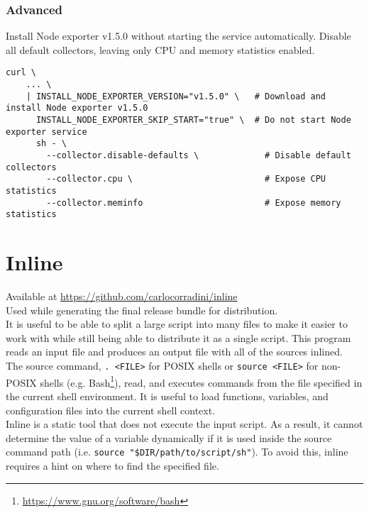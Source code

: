 \subsubsection{Advanced}
\label{subsubsec:corollary_projects_node_exporter_installer_example_advanced}

Install Node exporter v1.5.0 without starting the service automatically. Disable
all default collectors, leaving only CPU and memory statistics enabled.

\begin{lstlisting}[language=shell, alsoletter={-, .}, morekeywords={[3]{..., --collector.disable-defaults, --collector.cpu, --collector.meminfo, -}}, morekeywords={[4]{INSTALL_NODE_EXPORTER_VERSION, INSTALL_NODE_EXPORTER_SKIP_START}}, xleftmargin=\parindent, caption=Advanced installation with custom configuration parameters]
  curl \
    ... \
    | INSTALL_NODE_EXPORTER_VERSION="v1.5.0" \   # Download and install Node exporter v1.5.0
      INSTALL_NODE_EXPORTER_SKIP_START="true" \  # Do not start Node exporter service
      sh - \
        --collector.disable-defaults \             # Disable default collectors
        --collector.cpu \                          # Expose CPU statistics
        --collector.meminfo                        # Expose memory statistics
\end{lstlisting}

\section{Inline}
\label{sec:corollary_projects_inline}

Available at \url{https://github.com/carlocorradini/inline} \\ %
Used while generating the final release bundle for distribution. \\ %
It is useful to be able to split a large script into many files to make it easier
to work with while still being able to distribute it as a single script. This
program reads an input file and produces an output file with all of the sources
inlined. \\ %
The source command, \texttt{.\ <FILE>} for POSIX shells or \texttt{source <FILE>}
for non-POSIX shells (e.g. Bash\footnote{\url{https://www.gnu.org/software/bash}}),
read, and executes commands from the file specified in the current shell
environment. It is useful to load functions, variables, and configuration files into
the current shell context\cite{source}. \\ %
Inline is a static tool that does not execute the input script. As a result, it
cannot determine the value of a variable dynamically if it is used inside the
source command path (i.e. \texttt{source "\$DIR/path/to/script/sh"}). To avoid
this, inline requires a hint on where to find the specified file.

